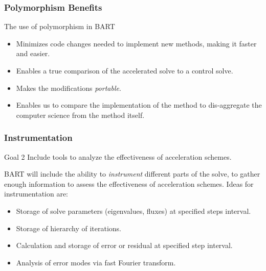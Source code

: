 \documentclass[xcolor=x11names, compress]{beamer}
\begin{document}
\begin{frame}
  \frametitle{Polymorphism Benefits}
  The use of polymorphism in BART
  \begin{itemize}
  \item<1-> Minimizes code changes needed to implement new methods,
    making it faster and easier.
  \item<2-> Enables a true comparison of the accelerated solve to a
    control solve.
  \item<3-> Makes the modifications \textit{portable}.    
  \item<4-> Enables us to compare the implementation of the method to
    dis-aggregate the computer science from the method itself.
  \end{itemize}
 
\end{frame}

\begin{frame}
  \frametitle{Instrumentation}
  \begin{block}{Goal 2}
    Include tools to analyze the effectiveness of
    acceleration schemes.
  \end{block}
\pause
BART will include the ability to \textit{instrument} different parts
  of the solve, to gather enough information to assess the
  effectiveness of acceleration schemes. Ideas for instrumentation
  are:
  \pause
\begin{itemize}[<+->]
  \item Storage of solve parameters (eigenvalues, fluxes) at
    specified steps interval.    
  \item Storage of hierarchy of iterations.
  \item Calculation and storage of error or residual at specified
    step interval.
  \item Analysis of error modes via fast Fourier transform.
  \end{itemize}
\end{frame}
\end{document}
